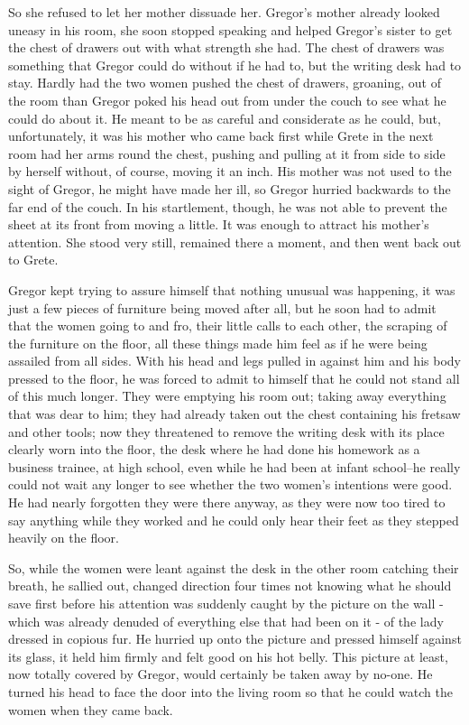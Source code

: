 So she refused to let her mother dissuade her. Gregor's mother already looked uneasy in his room, she soon stopped speaking and helped Gregor's sister to get the chest of drawers out with what strength she had. The chest of drawers was something that Gregor could do without if he had to, but the writing desk had to stay. Hardly had the two women pushed the chest of drawers, groaning, out of the room than Gregor poked his head out from under the couch to see what he could do about it. He meant to be as careful and considerate as he could, but, unfortunately, it was his mother who came back first while Grete in the next room had her arms round the chest, pushing and pulling at it from side to side by herself without, of course, moving it an inch. His mother was not used to the sight of Gregor, he might have made her ill, so Gregor hurried backwards to the far end of the couch. In his startlement, though, he was not able to prevent the sheet at its front from moving a little. It was enough to attract his mother's attention. She stood very still, remained there a moment, and then went back out to Grete.

Gregor kept trying to assure himself that nothing unusual was happening, it was just a few pieces of furniture being moved after all, but he soon had to admit that the women going to and fro, their little calls to each other, the scraping of the furniture on the floor, all these things made him feel as if he were being assailed from all sides. With his head and legs pulled in against him and his body pressed to the floor, he was forced to admit to himself that he could not stand all of this much longer. They were emptying his room out; taking away everything that was dear to him; they had already taken out the chest containing his fretsaw and other tools; now they threatened to remove the writing desk with its place clearly worn into the floor, the desk where he had done his homework as a business trainee, at high school, even while he had been at infant school--he really could not wait any longer to see whether the two women's intentions were good. He had nearly forgotten they were there anyway, as they were now too tired to say anything while they worked and he could only hear their feet as they stepped heavily on the floor.

So, while the women were leant against the desk in the other room catching their breath, he sallied out, changed direction four times not knowing what he should save first before his attention was suddenly caught by the picture on the wall - which was already denuded of everything else that had been on it - of the lady dressed in copious fur. He hurried up onto the picture and pressed himself against its glass, it held him firmly and felt good on his hot belly. This picture at least, now totally covered by Gregor, would certainly be taken away by no-one. He turned his head to face the door into the living room so that he could watch the women when they came back.

